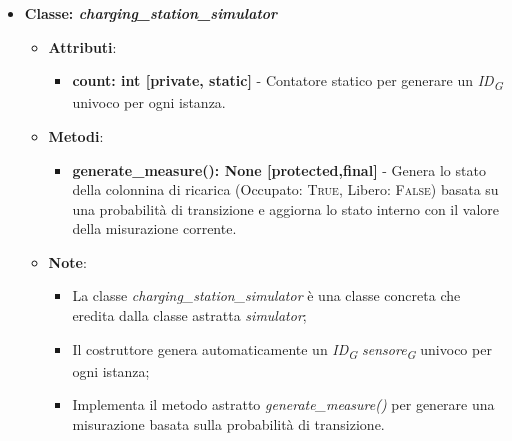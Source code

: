 \begin{itemize}
    \item{\textbf{Classe: \textit{charging\_station\_simulator}}}
    \begin{itemize}
        \item \textbf{Attributi}: 
        \begin{itemize}
            \item \textbf{count: int [private, static]} - Contatore statico per generare un \textit{ID}\textsubscript{\textit{G}} univoco per ogni istanza.
        \end{itemize}
        \item \textbf{Metodi}:
        \begin{itemize}
            \item \textbf{generate\_measure(): None [protected,final]} - Genera lo stato della colonnina di ricarica (Occupato: \textsc{True}, Libero: \textsc{False}) basata su una probabilità di transizione e aggiorna lo stato interno con il valore della misurazione corrente.
        \end{itemize}
        \item \textbf{Note}:
        \begin{itemize}
            \item La classe \textit{charging\_station\_simulator} è una classe concreta che eredita dalla classe astratta \textit{simulator};
            \item Il costruttore genera automaticamente un \textit{ID}\textsubscript{\textit{G}} \textit{sensore}\textsubscript{\textit{G}} univoco per ogni istanza;
            \item Implementa il metodo astratto \textit{generate\_measure()} per generare una misurazione basata sulla probabilità di transizione.
        \end{itemize}
    \end{itemize}


\end{itemize}
